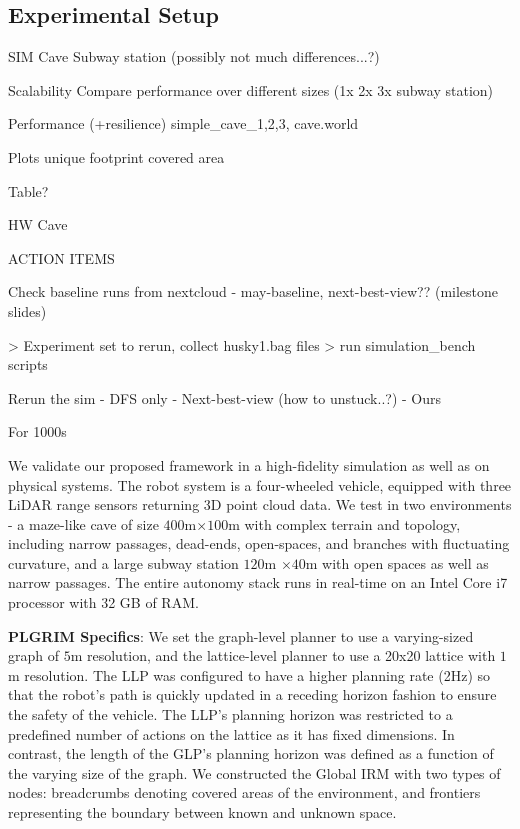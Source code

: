 \documentclass[letterpaper]{article} %
\newcommand{\ph}[1]{{\textbf{#1}:}} %
\begin{document}





\subsection{Experimental Setup}





SIM
Cave
Subway station (possibly not much differences...?)

Scalability
Compare performance over different sizes (1x 2x 3x subway station)

Performance (+resilience)
simple\_cave\_1,2,3, cave.world

Plots
unique footprint
covered area

Table?

HW
Cave


ACTION ITEMS

Check baseline runs from nextcloud
- may-baseline, next-best-view??
(milestone slides)

> Experiment set to rerun, collect husky1.bag files
> run simulation\_bench scripts

Rerun the sim
- DFS only
- Next-best-view (how to unstuck..?)
- Ours

For 1000s






We validate our proposed framework in a high-fidelity simulation as well as on physical systems. The robot system is a four-wheeled vehicle, equipped with three LiDAR range sensors returning 3D point cloud data. We test in two environments - a maze-like cave of size $400$m$ \times 100$m with complex terrain and topology, including narrow passages, dead-ends, open-spaces, and branches with fluctuating curvature, and a large subway station $120$m $\times 40$m with open spaces as well as narrow passages.  The entire autonomy stack runs in real-time on an Intel Core i7 processor with 32 GB of RAM.

\ph{PLGRIM Specifics}
We set the graph-level planner to use a varying-sized graph of $5$m resolution, and the lattice-level planner to use a 20x20 lattice with $1$m resolution.  The LLP was configured to have a higher planning rate (2Hz) so that the robot's path is quickly updated in a receding horizon fashion to ensure the safety of the vehicle. The LLP's planning horizon was restricted to a predefined number of actions on the lattice as it has fixed dimensions.  In contrast, the length of the GLP's planning horizon was defined as a function of the varying size of the graph. We constructed the Global IRM with two types of nodes: breadcrumbs denoting covered areas of the environment, and frontiers representing the boundary between known and unknown space.  
\end{document}

